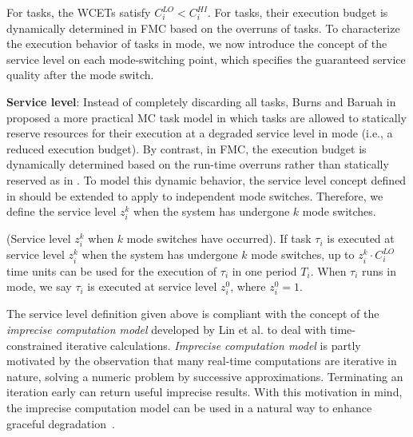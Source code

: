 \documentclass[10pt,journal,compsoc]{IEEEtran}
\begin{document}
For \hi tasks, the WCETs satisfy $C_i^{LO}<C_i^{HI}$. For \lo tasks, their execution budget is dynamically determined in FMC based on the overruns of \hi tasks. To characterize the execution behavior of \lo tasks in \hi mode, we now introduce the concept of the service level on each mode-switching point, which specifies the guaranteed service quality after the mode switch. 

\noindent\textbf{Service level}: Instead of completely discarding all \lo tasks, Burns and Baruah in \cite{burns2013towards} proposed a more practical MC task model in which \lo tasks are allowed to statically reserve resources for their execution
at a degraded service level in \hi mode (i.e., a reduced execution budget). By contrast, in FMC, the execution budget is dynamically determined based on the run-time overruns rather than statically reserved as in \cite{burns2013towards}. To model this dynamic behavior, the service level concept defined in \cite{burns2013towards} should be extended to apply to  independent mode switches. Therefore, we define the service level $z_i^k$ when the system has undergone \textit{$k$} mode switches. 
\begin{definition}
\label{def:6}
(Service level $z_i^k$ when \textit{$k$} mode switches have occurred).
If \lo task $\tau_i$ is executed at service level $z_i^k$ when the system has undergone \textit{$k$} mode switches, up to $z_i^k\cdot{}C_i^{LO}$ time units can be used for the execution of $\tau_i$ in one period $T_i$. When $\tau_i$ runs in \lo mode, we say $\tau_i$ is executed at service level $z_i^0$, where $z_i^0=1$.   
\end{definition} 
The service level definition given above is compliant with the concept of the \textit{imprecise computation model} developed by Lin et al.\cite{LinIMC} to deal with time-constrained iterative calculations. 
\textit{Imprecise computation model} is partly motivated by the observation that many real-time computations are iterative in nature, solving a numeric problem by successive approximations. Terminating an iteration early can return useful imprecise results. With this motivation in mind, the imprecise computation model can be used in a natural way to enhance graceful degradation~\cite{LinIMC1}.
\end{document}
